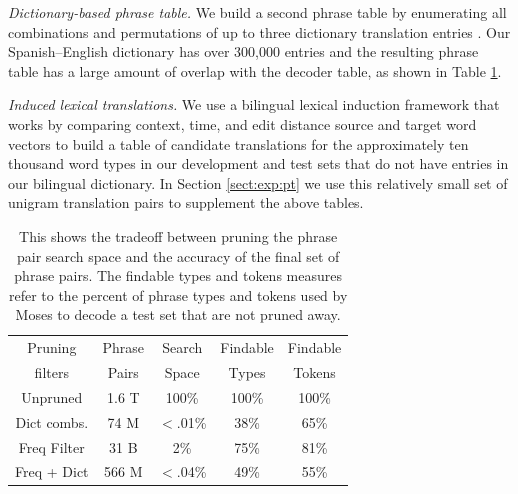 \documentclass[11pt]{article}
\newcommand{\mnote}[1]{\marginpar{%
  \vskip-\baselineskip
  \raggedright\footnotesize
  \itshape\hrule\smallskip\tiny{#1}\par\smallskip\hrule}}
\newcommand{\mtodo}[1]{\mnote{\textcolor{red}{#1}}}
\newcommand{\paraheader}[1]{\vskip 0.05in \noindent\emph{#1}}
\begin{document}
\paraheader{Dictionary-based phrase table.}\mtodo{Chris had a citation for this method} We build a second phrase table by enumerating all combinations and permutations of up to three dictionary translation entries \cite{garera08a}. Our Spanish--English dictionary has over 300,000 entries and the resulting phrase table has a large amount of overlap with the decoder table, as shown in Table \ref{table:prune}. 

\paraheader{Induced lexical translations.} We use a bilingual lexical induction framework that works by comparing context, time, and edit distance source and target word vectors to build a table of candidate translations for the approximately ten thousand word types in our development and test sets that do not have entries in our bilingual dictionary. In Section \ref{sect:exp:pt} we use this relatively small set of unigram translation pairs to supplement the above tables.


\begin{table}
\small
\begin{center}
\begin{tabular}{|c|c|c|c|c|}
\hline
Pruning 	& Phrase	& Search & 	Findable 	& Findable \\
filters	& Pairs	&  Space & Types 	&  Tokens \\
\hline
Unpruned & 1.6 T & 100\% & 100\% & 100\% \\
Dict combs. & 74 M & $<$.01\% & 38\% & 65\% \\
Freq Filter &  31 B & 2\% & 75\% & 81\% \\
Freq + Dict & 566 M & $<$.04\% & 49\% & 55\% \\
\hline
\end{tabular}
\caption{This shows the tradeoff between pruning the phrase pair search space and the accuracy of the final set of phrase pairs. The findable types and tokens measures refer to the percent of phrase types and tokens used by Moses to decode a test set that are not pruned away. }\label{table:prune}
\end{center}
\end{table}
\end{document}
